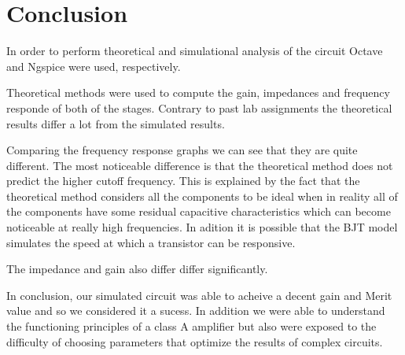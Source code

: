 
\section{Conclusion}
\label{sec:conclusion}



In order to perform theoretical and simulational analysis of the circuit Octave and Ngspice were used, respectively.


Theoretical methods were used to compute the gain, impedances and frequency responde of both of the stages. Contrary to past lab assignments the theoretical results differ a lot from the simulated results.

Comparing the frequency response graphs we can see that they are quite different. The most noticeable difference is that the theoretical method does not predict the higher cutoff frequency. This is explained by the fact that the theoretical method considers all the components to be ideal when in reality all of the components have some residual capacitive characteristics which can become noticeable at really high frequencies. In adition it is possible that the BJT model simulates the speed at which a transistor can be responsive.

The impedance and gain also differ differ significantly.

In conclusion, our simulated circuit was able to acheive a decent gain and Merit value and so we considered it a sucess. In addition we were able to understand the functioning principles of a class A amplifier but also were exposed to the difficulty of choosing parameters that optimize the results of complex circuits.
